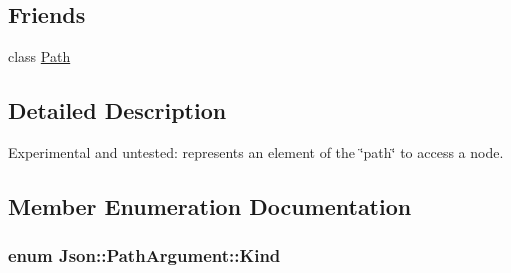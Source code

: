 \subsection*{Friends}
\begin{DoxyCompactItemize}
\item 
class \hyperlink{classJson_1_1PathArgument_a51971c24df68e5ad775ed4f8c33e968f}{Path}
\end{DoxyCompactItemize}


\subsection{Detailed Description}
Experimental and untested\-: represents an element of the \char`\"{}path\char`\"{} to access a node. 

\subsection{Member Enumeration Documentation}
\hypertarget{classJson_1_1PathArgument_a2420bbad778573c147e578701b84d9b9}{
\subsubsection[{Kind}]{\setlength{\rightskip}{0pt plus 5cm}enum {\bf Json\-::\-Path\-Argument\-::\-Kind}\hspace{0.3cm}{\ttfamily [private]}}}\label{dc/d2f/classJson_1_1PathArgument_a2420bbad778573c147e578701b84d9b9}
